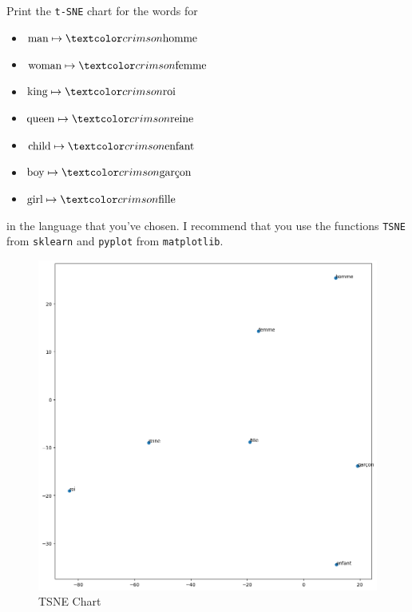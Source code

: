 \newpage
\begin{problem}
  Print the \verb|t-SNE| chart for the words for
  \begin{itemize}
    \item $\text{man} \mapsto \crim{\text{homme}}$
    \item $\text{woman} \mapsto \crim{\text{femme}}$
    \item $\text{king} \mapsto \crim{\text{roi}}$
    \item $\text{queen} \mapsto \crim{\text{reine}}$
    \item $\text{child} \mapsto \crim{\text{enfant}}$
    \item $\text{boy} \mapsto \crim{\text{gar\c{c}on}}$
    \item $\text{girl} \mapsto \crim{\text{fille}}$
  \end{itemize}
  in the language that you’ve chosen.
  I recommend that you use the functions \verb|TSNE| from \verb|sklearn|
  and \verb|pyplot| from \verb|matplotlib|.



  \begin{figure}[H]
    \centering
    \begin{minipage}[b]{0.8\textwidth}
      \centering
      \includegraphics[width=\textwidth]{figures/3-tsne.png}
      \caption{TSNE Chart}
      \label{fig:tsne-chart}
    \end{minipage}
  \end{figure}


\end{problem}
